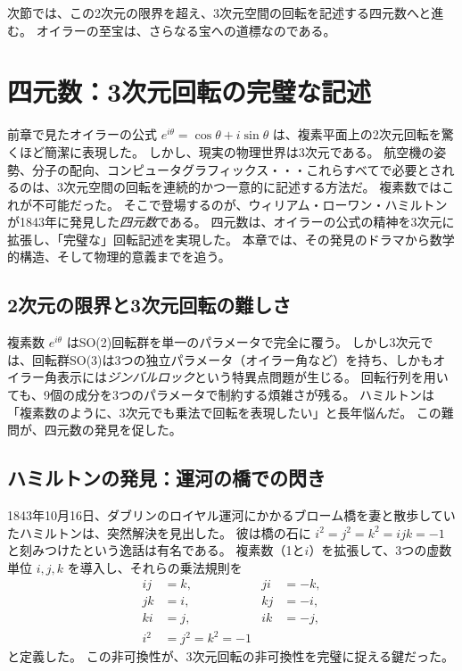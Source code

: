 \documentclass[dvipdfmx,a4paper]{jsbook}
\theoremstyle{definition}
\theoremstyle{remark}
\begin{document}
次節では、この2次元の限界を超え、3次元空間の回転を記述する四元数へと進む。
オイラーの至宝は、さらなる宝への道標なのである。

\chapter{四元数：3次元回転の完璧な記述}
\label{chap:quaternion}

前章で見たオイラーの公式 $e^{i\theta} = \cos\theta + i\sin\theta$ は、複素平面上の2次元回転を驚くほど簡潔に表現した。
しかし、現実の物理世界は3次元である。
航空機の姿勢、分子の配向、コンピュータグラフィックス・・・これらすべてで必要とされるのは、3次元空間の回転を連続的かつ一意的に記述する方法だ。
複素数ではこれが不可能だった。
そこで登場するのが、ウィリアム・ローワン・ハミルトンが1843年に発見した\emph{四元数}である。
四元数は、オイラーの公式の精神を3次元に拡張し、「完璧な」回転記述を実現した。
本章では、その発見のドラマから数学的構造、そして物理的意義までを追う。

\section{2次元の限界と3次元回転の難しさ}
\label{sec:quaternion-limitation}

複素数 $e^{i\theta}$ はSO(2)回転群を単一のパラメータで完全に覆う。
しかし3次元では、回転群SO(3)は3つの独立パラメータ（オイラー角など）を持ち、しかもオイラー角表示には\emph{ジンバルロック}という特異点問題が生じる。
回転行列を用いても、9個の成分を3つのパラメータで制約する煩雑さが残る。
ハミルトンは「複素数のように、3次元でも乗法で回転を表現したい」と長年悩んだ。
この難問が、四元数の発見を促した。

\section{ハミルトンの発見：運河の橋での閃き}
\label{sec:hamilton-discovery}

1843年10月16日、ダブリンのロイヤル運河にかかるブローム橋を妻と散歩していたハミルトンは、突然解決を見出した。
彼は橋の石に $i^2 = j^2 = k^2 = ijk = -1$ と刻みつけたという逸話は有名である。
複素数（1と$i$）を拡張して、3つの虚数単位 $i,j,k$ を導入し、それらの乗法規則を
\begin{align}
  ij &= k, & ji &= -k, \\
  jk &= i, & kj &= -i, \\
  ki &= j, & ik &= -j, \\
  i^2 &= j^2 = k^2 = -1
\end{align}
と定義した。
この非可換性が、3次元回転の非可換性を完璧に捉える鍵だった。
\end{document}
